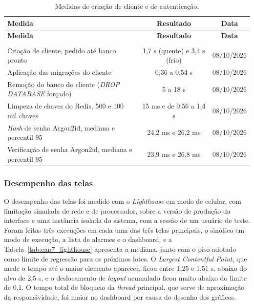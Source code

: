 {\renewcommand{\arraystretch}{1.3}\small
\begin{xltabular}{\textwidth}{Xcc}
        \caption{Medidas de criação de cliente e de autenticação.}
        \label{tab:cap7_infra}\\
        \hline
        \textbf{Medida} & \textbf{Resultado} & \textbf{Data} \\
        \hline
        \endfirsthead
        \hline
        \textbf{Medida} & \textbf{Resultado} & \textbf{Data} \\
        \hline
        \endhead
        \endfoot
         \\
        \endlastfoot
        Criação de cliente, pedido até banco pronto & 1,7 s (quente) e 3,4 s (frio) & 08/10/2026 \\
        \hline
        Aplicação das migrações do cliente & 0,36 a 0,54 s & 08/10/2026 \\
        \hline
        Remoção do banco do cliente (\emph{DROP DATABASE} forçado) & 5 a 18 s & 08/10/2026 \\
        \hline
        Limpeza de chaves do Redis, 500 e 100 mil chaves & 15 ms e de 0,56 a 1,4 s & 08/10/2026 \\
        \hline
        \emph{Hash} de senha Argon2id, mediana e percentil 95 & 24,2 ms e 26,2 ms & 08/10/2026 \\
        \hline
        Verificação de senha Argon2id, mediana e percentil 95 & 23,9 ms e 26,8 ms & 08/10/2026 \\
        \hline
\end{xltabular}}

\subsubsection{Desempenho das telas}

\par O desempenho das telas foi medido com o \emph{Lighthouse} em modo de celular, com limitação simulada de rede e de processador, sobre a versão de produção da interface e uma instância isolada do sistema, com a sessão de um usuário de teste. Foram feitas três execuções em cada uma das três telas principais, o sinótico em modo de execução, a lista de alarmes e o dashboard, e a Tabela~\ref{tab:cap7_lighthouse} apresenta a mediana, junto com o piso adotado como limite de regressão para os próximos lotes. O \emph{Largest Contentful Paint}, que mede o tempo até o maior elemento aparecer, ficou entre 1,25 e 1,51 s, abaixo do alvo de 2,5 s, e o deslocamento de \emph{layout} acumulado ficou muito abaixo do limite de 0,1. O tempo total de bloqueio da \emph{thread} principal, que serve de aproximação da responsividade, foi maior no dashboard por causa do desenho dos gráficos.


